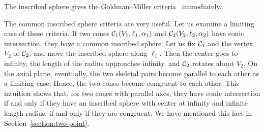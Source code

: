      The inscribed sphere gives the Goldman--Miller 
criteria~\cite{goldman:1990} immediately.

%

     The common inscribed sphere criteria are very useful.  Let us examine a
limiting case of these 
criteria. If two cones ${\cal C}_1(V_1,\ell_1,\alpha_1)$ 
and ${\cal C}_2(V_2,\ell_2,\alpha_2)$ have conic intersection, they have a 
common inscribed sphere.  Let us fix ${\cal C}_1$ and the vertex $V_2$ of
${\cal C}_2$, and move the inscribed sphere along $\ell_1$.  Then the center
goes to infinity, the length of the radius approaches infinity, 
and ${\cal C}_2$ rotates about $V_2$.  On the axial plane, eventually, the two
skeletal pairs become parallel to each other as a limiting case.  Hence, the
two cones become congruent to each other.  This intuition shows that, for two
cones with parallel axes, they have conic intersection if and only if they
have an inscribed sphere with center at infinity and infinite length radius,
if and only if they are congruent.  We have mentioned this fact in
Section~\ref{section:two-point}.


